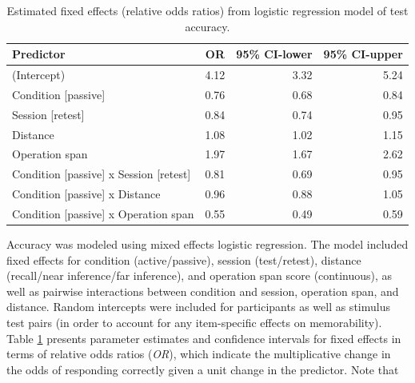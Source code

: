 \documentclass[floatsintext,man]{apa6}
\theoremstyle{definition}
\theoremstyle{definition}
\theoremstyle{definition}
\theoremstyle{remark}
\begin{document}
\begin{table}[tbp]
\begin{center}
\begin{threeparttable}
\caption{\label{tab:accuracy}Estimated fixed effects (relative odds ratios) from logistic regression model of test accuracy.}
\small{
\begin{tabular}{lrrr}
\toprule
Predictor & \multicolumn{1}{c}{OR} & \multicolumn{1}{c}{95\% CI-lower} & \multicolumn{1}{c}{95\% CI-upper}\\
\midrule
(Intercept) & 4.12 & 3.32 & 5.24\\
Condition [passive] & 0.76 & 0.68 & 0.84\\
Session [retest] & 0.84 & 0.74 & 0.95\\
Distance & 1.08 & 1.02 & 1.15\\
Operation span & 1.97 & 1.67 & 2.62\\
Condition [passive] x Session [retest] & 0.81 & 0.69 & 0.95\\
Condition [passive] x Distance & 0.96 & 0.88 & 1.05\\
Condition [passive] x Operation span & 0.55 & 0.49 & 0.59\\
\bottomrule
\end{tabular}
}
\end{threeparttable}
\end{center}
\end{table}

Accuracy was modeled using mixed effects logistic regression. The model
included fixed effects for condition (active/passive), session
(test/retest), distance (recall/near inference/far inference), and
operation span score (continuous), as well as pairwise interactions
between condition and session, operation span, and distance. Random
intercepts were included for participants as well as stimulus test pairs
(in order to account for any item-specific effects on memorability).
Table \ref{tab:accuracy} presents parameter estimates and confidence
intervals for fixed effects in terms of relative odds ratios
(\emph{OR}), which indicate the multiplicative change in the odds of
responding correctly given a unit change in the predictor. Note that
\end{document}
